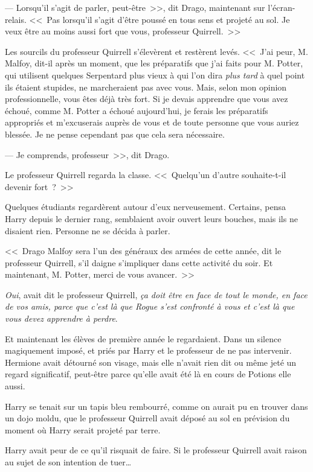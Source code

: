 --- Lorsqu'il s'agit de parler, peut-être~>>, dit Drago, maintenant sur l'écran-relais. <<~Pas lorsqu'il s'agit d'être poussé en tous sens et projeté au sol. Je veux être au moins aussi fort que vous, professeur Quirrell.~>>

Les sourcils du professeur Quirrell s'élevèrent et restèrent levés. <<~J'ai peur, M. Malfoy, dit-il après un moment, que les préparatifs que j'ai faits pour M. Potter, qui utilisent quelques Serpentard plus vieux à qui l'on dira \emph{plus tard} à quel point ils étaient stupides, ne marcheraient pas avec vous. Mais, selon mon opinion professionnelle, vous êtes déjà très fort. Si je devais apprendre que vous avez échoué, comme M. Potter a échoué aujourd'hui, je ferais les préparatifs appropriés et m'excuserais auprès de vous et de toute personne que vous auriez blessée. Je ne pense cependant pas que cela sera nécessaire.

--- Je comprends, professeur~>>, dit Drago.

Le professeur Quirrell regarda la classe. <<~Quelqu'un d'autre souhaite-t-il devenir fort~?~>>

Quelques étudiants regardèrent autour d'eux nerveusement. Certains, pensa Harry depuis le dernier rang, semblaient avoir ouvert leurs bouches, mais ils ne disaient rien. Personne ne se décida à parler.

<<~Drago Malfoy sera l'un des généraux des armées de cette année, dit le professeur Quirrell, s'il daigne s'impliquer dans cette activité du soir. Et maintenant, M. Potter, merci de vous avancer.~>>

\later

\emph{Oui}, avait dit le professeur Quirrell, \emph{ça doit être en face de tout le monde, en face de vos amis, parce que c'est là que Rogue s'est confronté à vous et c'est là que vous devez apprendre à perdre}.

Et maintenant les élèves de première année le regardaient. Dans un silence magiquement imposé, et priés par Harry et le professeur de ne pas intervenir. Hermione avait détourné son visage, mais elle n'avait rien dit ou même jeté un regard significatif, peut-être parce qu'elle avait été là en cours de Potions elle aussi.

Harry se tenait sur un tapis bleu rembourré, comme on aurait pu en trouver dans un dojo moldu, que le professeur Quirrell avait déposé au sol en prévision du moment où Harry serait projeté par terre.

Harry avait peur de ce qu'il risquait de faire. Si le professeur Quirrell avait raison au sujet de son intention de tuer…


